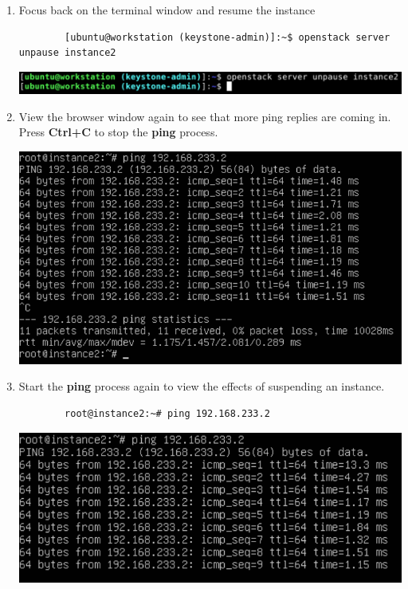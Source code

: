 \documentclass[letterpaper, 12pt]{article}
\begin{document}
\begin{enumerate}
    \item Focus back on the terminal window and resume the instance
    \begin{lstlisting}
        [ubuntu@workstation (keystone-admin)]:~$ openstack server unpause instance2
    \end{lstlisting}

    \begin{center}
        \includegraphics[width=\linewidth]{images/part4/step7.png}
    \end{center}

    \item View the browser window again to see that more ping replies are coming in. Press \textbf{Ctrl+C} to stop the
    \textbf{ping} process.

    \begin{center}
        \includegraphics[width=\linewidth]{images/part4/step8.png}
    \end{center}

    \item Start the \textbf{ping} process again to view the effects of suspending an instance.
    \begin{lstlisting}
        root@instance2:~# ping 192.168.233.2
    \end{lstlisting}

    \begin{center}
        \includegraphics[width=\linewidth]{images/part4/step9.png}
    \end{center}


\end{enumerate}
\end{document}
